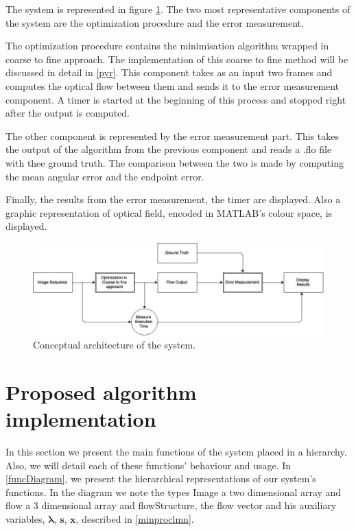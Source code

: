\documentclass[12pt,a4paper,twoside]{report}
\begin{document}
{The system is represented in figure \ref{bigd}.
The two most representative components of the system are the optimization procedure and the error measurement.

The optimization procedure contains the minimisation algorithm wrapped in coarse to fine approach. The implementation of this coarse to fine method will be discussed in detail in \ref{pyr}. This component takes as an input two frames and computes the optical flow between them and sends it to the error measurement component. A timer is started at the beginning of this process and stopped right after the output is computed.


The other component is represented by the error measurement part. This takes the output of the algorithm from the previous component and reads a .flo file with thee ground truth. The comparison between the two is made by computing the mean angular error and the endpoint error.  

Finally, the results from the error measurement, the timer are displayed. Also a graphic representation of optical field, encoded in MATLAB's colour space, is displayed.


\begin{figure}
	\label{bigd}
	\centering
	\includegraphics[width = 6.2in]{img/bigflow} 
	\caption{Conceptual architecture of the system.}
\end{figure}

\section{Proposed algorithm implementation}

In this section we present the main functions of the system placed in a hierarchy. Also, we will detail each of these functions' behaviour and usage. In \ref{funcDiagram}, we present the hierarchical representations of our system's functions. In the diagram we note the types Image a two dimensional array and flow a 3 dimensional array and flowStructure, the flow vector and his auxiliary variables, $\boldsymbol{\lambda}$, $\boldsymbol{s}$, $\boldsymbol{x}$, described in \ref{minproclmn}.


}
\end{document}

